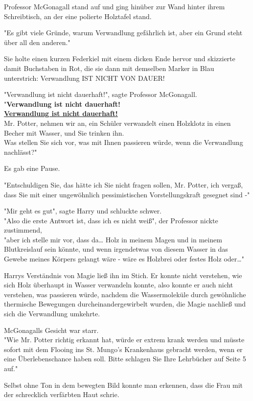 {Professor McGonagall stand auf und ging hinüber zur Wand hinter ihrem Schreibtisch, an der eine polierte Holztafel stand.

"Es gibt viele Gründe, warum Verwandlung gefährlich ist, aber ein Grund steht über all den anderen."

Sie holte einen kurzen Federkiel mit einem dicken Ende hervor und skizzierte damit Buchstaben in Rot, die sie dann mit demselben Marker in Blau unterstrich: Verwandlung IST NICHT VON DAUER!

"Verwandlung ist nicht dauerhaft!", sagte Professor McGonagall.\\ "\textbf{Verwandlung ist nicht dauerhaft!}\\ \textbf{\uline{Verwandlung ist nicht dauerhaft!}}\\ Mr. Potter, nehmen wir an, ein Schüler verwandelt einen Holzklotz in einen Becher mit Wasser, und Sie trinken ihn.\\ Was stellen Sie sich vor, was mit Ihnen passieren würde, wenn die Verwandlung nachlässt?"

Es gab eine Pause.

"Entschuldigen Sie, das hätte ich Sie nicht fragen sollen, Mr. Potter, ich vergaß, dass Sie mit einer ungewöhnlich pessimistischen Vorstellungskraft gesegnet sind -"

"Mir geht es gut", sagte Harry und schluckte schwer.\\ "Also die erste Antwort ist, dass ich es nicht weiß", der Professor nickte zustimmend,\\ "aber ich stelle mir vor, dass da… Holz in meinem Magen und in meinem Blutkreislauf sein könnte, und wenn irgendetwas von diesem Wasser in das Gewebe meines Körpers gelangt wäre - wäre es Holzbrei oder festes Holz oder…"

Harrys Verständnis von Magie ließ ihn im Stich. Er konnte nicht verstehen, wie sich Holz überhaupt in Wasser verwandeln konnte, also konnte er auch nicht verstehen, was passieren würde, nachdem die Wassermoleküle durch gewöhnliche thermische Bewegungen durcheinandergewirbelt wurden, die Magie nachließ und sich die Verwandlung umkehrte.

McGonagalls Gesicht war starr.\\ "Wie Mr. Potter richtig erkannt hat, würde er extrem krank werden und müsste sofort mit dem Flooing ins St. Mungo's Krankenhaus gebracht werden, wenn er eine Überlebenschance haben soll. Bitte schlagen Sie Ihre Lehrbücher auf Seite 5 auf."

Selbst ohne Ton in dem bewegten Bild konnte man erkennen, dass die Frau mit der schrecklich verfärbten Haut schrie.

}
